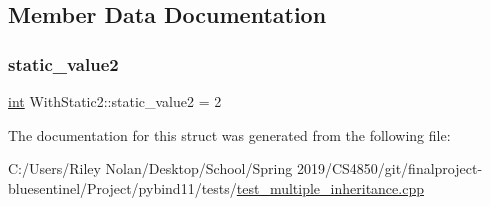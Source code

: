 \subsection{Member Data Documentation}
\mbox{\label{struct_with_static2_add6875231bdb922e03512ace418f690a}} 
\subsubsection{\texorpdfstring{static\_value2}{static\_value2}}
{\footnotesize\ttfamily \mbox{\hyperlink{warnings_8h_a74f207b5aa4ba51c3a2ad59b219a423b}{int}} With\+Static2\+::static\+\_\+value2 = 2\hspace{0.3cm}{\ttfamily [static]}}



The documentation for this struct was generated from the following file\+:\begin{DoxyCompactItemize}
\item 
C\+:/\+Users/\+Riley Nolan/\+Desktop/\+School/\+Spring 2019/\+C\+S4850/git/finalproject-\/bluesentinel/\+Project/pybind11/tests/\mbox{\hyperlink{test__multiple__inheritance_8cpp}{test\+\_\+multiple\+\_\+inheritance.\+cpp}}\end{DoxyCompactItemize}
